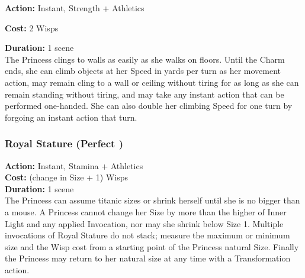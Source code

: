 \noindent \textbf{Action:} Instant, Strength + Athletics

\noindent \textbf{Cost:} 2 Wisps

\noindent \textbf{Duration:} 1 scene \\

\noindent The Princess clings to walls as easily as she walks on floors. Until the Charm ends, she can climb objects at her Speed in yards per turn as her movement action, may remain cling to a wall or ceiling without tiring  for as long as she can remain standing without tiring, and may take any instant action that can be performed one-handed. She can also double her climbing Speed for one turn by forgoing an instant action that turn.

\subsubsection*{Royal Stature (Perfect \textbullet\textbullet\textbullet\textbullet)}

\noindent \textbf{Action:} Instant, Stamina + Athletics\\

\noindent \textbf{Cost:} (change in Size + 1) Wisps\\

\noindent \textbf{Duration:} 1 scene \\

\noindent The Princess can assume titanic sizes or shrink herself until she is no bigger than a mouse. A Princess cannot change her Size by more than the higher of Inner Light and any applied Invocation, nor may she shrink below Size 1. Multiple invocations of Royal Stature do not stack; measure the maximum or minimum size and the Wisp cost from a starting point of the Princess natural Size. Finally the Princess may return to her natural size at any time with a Transformation action.  
\label{SizeTable}

	\bigsidebarstart

 \centering 
 
